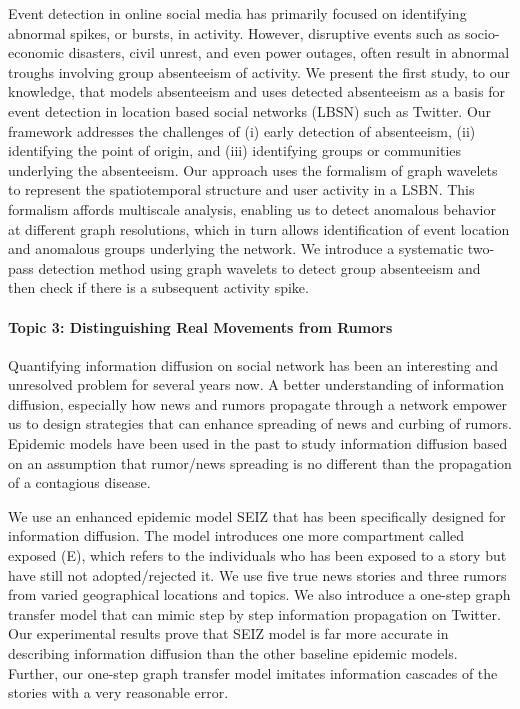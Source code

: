Event detection in online social media has primarily focused on identifying
abnormal spikes, or bursts, in activity. However, disruptive events such as socio-economic disasters, civil unrest, and even power outages, often result in abnormal troughs involving group absenteeism of activity. We present the first study, to our knowledge, that models absenteeism and uses detected absenteeism as a basis for event detection in location based social networks (LBSN) such as Twitter. Our framework addresses the challenges of (i) early detection of absenteeism, (ii) identifying the point of origin, and (iii) identifying groups or communities underlying the absenteeism. Our approach uses the formalism of graph wavelets to represent the spatiotemporal structure and user activity in a LSBN. This formalism affords multiscale analysis, enabling us to detect anomalous behavior at different graph resolutions, which in turn allows identification of event location and anomalous groups underlying the network. We introduce a systematic two-pass detection method using graph wavelets to detect group absenteeism and then check if there is a subsequent activity spike.

\paragraph{Topic 3: Distinguishing Real Movements from Rumors}

Quantifying information diffusion on social network has been an interesting and unresolved problem for several years now. A better understanding of information diffusion, especially how news and rumors propagate through a network empower us to design strategies that can enhance spreading of news and curbing of rumors. Epidemic models have been used in the past to study information diffusion based on an assumption that rumor/news spreading is no different than the propagation of a contagious disease.

We use an enhanced epidemic model SEIZ that has been specifically designed for information diffusion. The model introduces one more compartment called exposed (E), which refers to the individuals who has been exposed to a story but have still not adopted/rejected it. We use five true news stories and three rumors from varied geographical locations and topics. We also introduce a one-step graph transfer model that can mimic step by step information propagation on Twitter. Our experimental results prove that SEIZ model is far more accurate in describing information diffusion than the other baseline epidemic models. Further, our one-step graph transfer model imitates information cascades of the stories with a very reasonable error.

